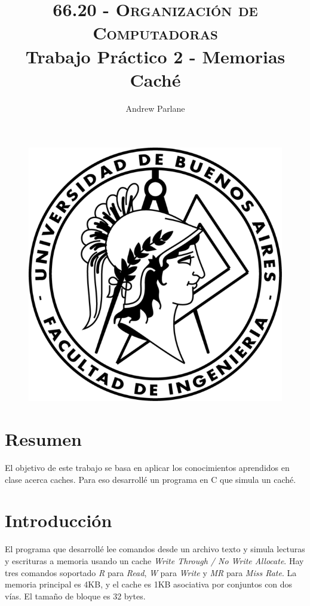 \documentclass[a4paper]{article}
\begin{document}
\begin{figure}
\centering
\includegraphics[scale=1]{./img/logo-facu}
\end{figure}  

\title{\large\textsc{66.20 - Organización de Computadoras}\\
\large Trabajo Práctico 2 - Memorias Caché}

\author{
Andrew Parlane\\
}

\maketitle

\newpage

\tableofcontents

\newpage

\section{Resumen}
El objetivo de este trabajo se basa en aplicar los conocimientos aprendidos en clase acerca caches. Para eso desarrollé un programa en C que simula un caché.

\section{Introducción}
El programa que desarrollé lee comandos desde un archivo texto y simula lecturas y escrituras a memoria usando un cache \textit{Write Through / No Write Allocate}. Hay tres comandos soportado \textit{R} para \textit{Read}, \textit{W} para \textit{Write} y \textit{MR} para \textit{Miss Rate}. La memoria principal es 4KB, y el cache es 1KB asociativa por conjuntos con dos vías. El tamaño de bloque es 32 bytes.
\end{document}
